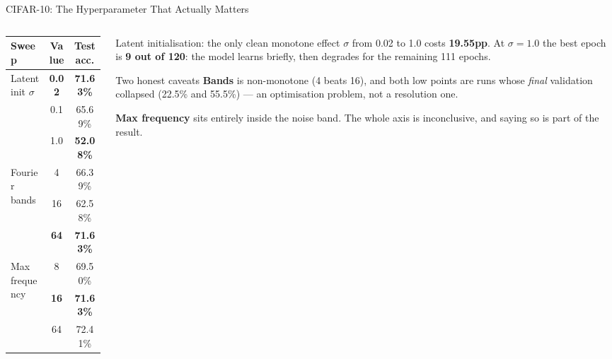 \documentclass[aspectratio=169,11pt]{beamer}
\begin{document}
\begin{frame}[shrink=5]{CIFAR-10: The Hyperparameter That Actually Matters}
  \begin{columns}[T]
    \begin{column}{0.50\textwidth}
      \begin{table}
        \centering\small
        \begin{tabular}{lcc}
          \toprule
          \textbf{Sweep} & \textbf{Value} & \textbf{Test acc.} \\
          \midrule
          \multirow{3}{*}{Latent init $\sigma$}
            & \textbf{0.02} & \textbf{71.63\%} \\
            & 0.1 & \textcolor{AccentOrange}{65.69\%} \\
            & 1.0 & \textcolor{AccentRed}{\textbf{52.08\%}} \\
          \midrule
          \multirow{3}{*}{Fourier bands}
            & 4 & 66.39\% \\
            & 16 & 62.58\% \\
            & \textbf{64} & \textbf{71.63\%} \\
          \midrule
          \multirow{3}{*}{Max frequency}
            & 8 & 69.50\% \\
            & \textbf{16} & \textbf{71.63\%} \\
            & 64 & 72.41\% \\
          \bottomrule
        \end{tabular}
      \end{table}
    \end{column}
    \begin{column}{0.46\textwidth}
      \begin{alertblock}{Latent initialisation: the only clean monotone effect}
        \small
        $\sigma$ from 0.02 to 1.0 costs \textbf{19.55pp}. At $\sigma=1.0$ the best epoch is \textbf{9 out of 120}: the model learns briefly, then degrades for the remaining 111 epochs.
      \end{alertblock}

      \vspace{0.3em}
      \begin{block}{Two honest caveats}
        \scriptsize
        \textbf{Bands} is non-monotone (4 beats 16), and both low points are runs whose \emph{final} validation collapsed (22.5\% and 55.5\%) --- an optimisation problem, not a resolution one.

        \vspace{0.3em}
        \textbf{Max frequency} sits entirely inside the noise band. The whole axis is inconclusive, and saying so is part of the result.
      \end{block}
    \end{column}
  \end{columns}
\end{frame}
\end{document}
